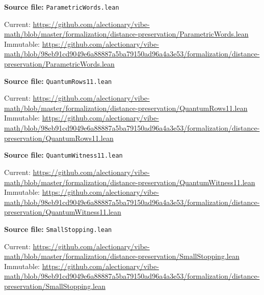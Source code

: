 \par\smallskip\noindent\begin{minipage}{\linewidth}\small\setlength{\baselineskip}{11pt}
\textbf{Source file:} \nolinkurl{ParametricWords.lean}\par\nopagebreak
Current: \url{https://github.com/alectionary/vibe-math/blob/master/formalization/distance-preservation/ParametricWords.lean}\\
Immutable: \url{https://github.com/alectionary/vibe-math/blob/98eb91cd9049e6a88887a5ba79150ad96a4a3e53/formalization/distance-preservation/ParametricWords.lean}\par\end{minipage}\par
\par\smallskip\noindent\begin{minipage}{\linewidth}\small\setlength{\baselineskip}{11pt}
\textbf{Source file:} \nolinkurl{QuantumRows11.lean}\par\nopagebreak
Current: \url{https://github.com/alectionary/vibe-math/blob/master/formalization/distance-preservation/QuantumRows11.lean}\\
Immutable: \url{https://github.com/alectionary/vibe-math/blob/98eb91cd9049e6a88887a5ba79150ad96a4a3e53/formalization/distance-preservation/QuantumRows11.lean}\par\end{minipage}\par
\par\smallskip\noindent\begin{minipage}{\linewidth}\small\setlength{\baselineskip}{11pt}
\textbf{Source file:} \nolinkurl{QuantumWitness11.lean}\par\nopagebreak
Current: \url{https://github.com/alectionary/vibe-math/blob/master/formalization/distance-preservation/QuantumWitness11.lean}\\
Immutable: \url{https://github.com/alectionary/vibe-math/blob/98eb91cd9049e6a88887a5ba79150ad96a4a3e53/formalization/distance-preservation/QuantumWitness11.lean}\par\end{minipage}\par
\par\smallskip\noindent\begin{minipage}{\linewidth}\small\setlength{\baselineskip}{11pt}
\textbf{Source file:} \nolinkurl{SmallStopping.lean}\par\nopagebreak
Current: \url{https://github.com/alectionary/vibe-math/blob/master/formalization/distance-preservation/SmallStopping.lean}\\
Immutable: \url{https://github.com/alectionary/vibe-math/blob/98eb91cd9049e6a88887a5ba79150ad96a4a3e53/formalization/distance-preservation/SmallStopping.lean}\par\end{minipage}\par
